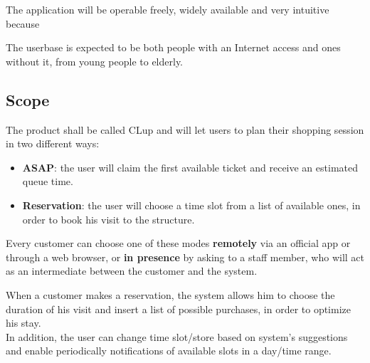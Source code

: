 \documentclass[12pt]{article}
\begin{document}
The application will be operable freely, widely available and very intuitive because 

The userbase is expected to be both people with an Internet access and ones without it, from young people to elderly.

\subsection{Scope}
The product shall be called CLup and will let users to plan their shopping session in two different ways:
\begin{itemize}
    \item {\textbf{ASAP}: the user will claim the first available ticket and receive an estimated queue time.}
    \item {\textbf{Reservation}: the user will choose a time slot from a list of available ones, in order to book his visit to the structure.}
\end{itemize}

Every customer can choose one of these modes \textbf{remotely} via an official app or through a web browser, or \textbf{in presence} by asking to a staff member, who will act as an intermediate between the customer and the system.

When a customer makes a reservation, the system allows him to choose the duration of his visit and insert a list of possible purchases, in order to optimize his stay.\\

In addition, the user can change time slot/store based on system's suggestions and enable periodically notifications of available slots in a day/time range.
\end{document}

